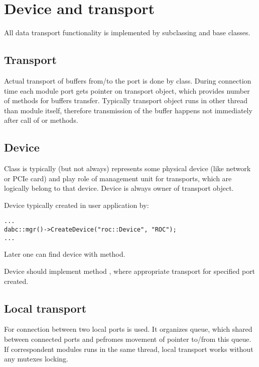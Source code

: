 \section{Device and transport}
\label{prog_plugin_device}
All data transport functionality is implemented by 
   subclassing   and  base classes.

\subsection{Transport}

Actual transport of buffers from/to the port is done by  class.
During connection time each module port gets pointer on transport object, which provides
number of methods for buffers transfer. Typically transport object runs in other thread than module itself, 
therefore transmission of the buffer happens not immediately after call of 
 or  methods.

 

\subsection{Device}

Class  is typically (but not always) represents some physical
device (like network or PCIe card) and play role of management unit for transports,
which are logically belong to that device. Device is always owner of transport object.

Device typically created in user application by:
\begin{small}
\begin{verbatim}
...
dabc::mgr()->CreateDevice("roc::Device", "ROC");
...
\end{verbatim}     
\end{small}

Later one can find device with  method.

Device should implement method , 
where appropriate transport for specified port created.
 

\subsection{Local transport}

For connection between two local ports  is used.
It organizes queue, which shared between connected ports and pefromes
movement of  pointer to/from this queue.
If correspondent modules runs in the same thread, 
local transport works without any mutexes locking.

